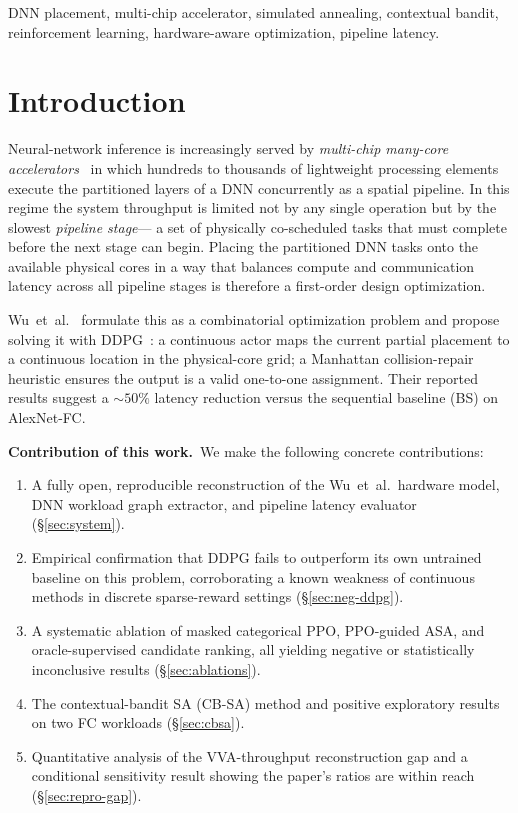\documentclass[10pt,conference]{IEEEtran}
\begin{document}
\begin{IEEEkeywords}
DNN placement, multi-chip accelerator, simulated annealing, contextual bandit,
reinforcement learning, hardware-aware optimization, pipeline latency.
\end{IEEEkeywords}

\section{Introduction}
\label{sec:intro}

Neural-network inference is increasingly served by \emph{multi-chip many-core
accelerators}~\cite{wu2020todaes,shao2019simba} in which hundreds to thousands
of lightweight processing elements execute the partitioned layers of a DNN
concurrently as a spatial pipeline.  In this regime the system throughput is
limited not by any single operation but by the slowest \emph{pipeline stage}---
a set of physically co-scheduled tasks that must complete before the next stage
can begin.  Placing the partitioned DNN tasks onto the available physical cores
in a way that balances compute and communication latency across all pipeline
stages is therefore a first-order design optimization.

Wu~et~al.~\cite{wu2020todaes} formulate this as a combinatorial optimization
problem and propose solving it with DDPG~\cite{lillicrap2016ddpg}: a continuous
actor maps the current partial placement to a continuous location in the
physical-core grid; a Manhattan collision-repair heuristic ensures the output
is a valid one-to-one assignment.  Their reported results suggest a ${\sim}50\%$
latency reduction versus the sequential baseline (BS) on AlexNet-FC.

\textbf{Contribution of this work.}\ We make the following concrete
contributions:

\begin{enumerate}
  \item A fully open, reproducible reconstruction of the Wu~et~al.\ hardware
        model, DNN workload graph extractor, and pipeline latency evaluator
        (\S\ref{sec:system}).
  \item Empirical confirmation that DDPG fails to outperform its own
        untrained baseline on this problem, corroborating a known weakness of
        continuous methods in discrete sparse-reward settings
        (\S\ref{sec:neg-ddpg}).
  \item A systematic ablation of masked categorical PPO, PPO-guided ASA,
        and oracle-supervised candidate ranking, all yielding negative or
        statistically inconclusive results (\S\ref{sec:ablations}).
  \item The contextual-bandit SA (CB-SA) method and positive exploratory
        results on two FC workloads (\S\ref{sec:cbsa}).
  \item Quantitative analysis of the VVA-throughput reconstruction gap and a
        conditional sensitivity result showing the paper's ratios are within
        reach (\S\ref{sec:repro-gap}).
\end{enumerate}
\end{document}
